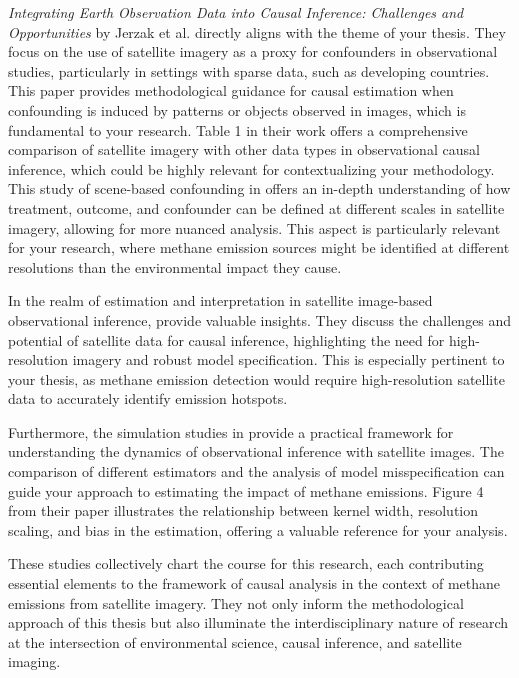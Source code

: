 \textit{Integrating Earth Observation Data into Causal Inference: Challenges and Opportunities} by Jerzak et al. \cite{jerzak_integrating_2023} directly aligns with the theme of your thesis. They focus on the use of satellite imagery as a proxy for confounders in observational studies, particularly in settings with sparse data, such as developing countries. This paper provides methodological guidance for causal estimation when confounding is induced by patterns or objects observed in images, which is fundamental to your research. Table 1 in their work \cite[Table 1]{jerzak_integrating_2023} offers a comprehensive comparison of satellite imagery with other data types in observational causal inference, which could be highly relevant for contextualizing your methodology. This study of scene-based confounding in \cite{jerzak_integrating_2023} offers an in-depth understanding of how treatment, outcome, and confounder can be defined at different scales in satellite imagery, allowing for more nuanced analysis. This aspect is particularly relevant for your research, where methane emission sources might be identified at different resolutions than the environmental impact they cause.

In the realm of estimation and interpretation in satellite image-based observational inference, provide valuable insights. They discuss the challenges and potential of satellite data for causal inference, highlighting the need for high-resolution imagery and robust model specification. This is especially pertinent to your thesis, as methane emission detection would require high-resolution satellite data to accurately identify emission hotspots.

Furthermore, the simulation studies in \cite{jerzak_integrating_2023} provide a practical framework for understanding the dynamics of observational inference with satellite images. The comparison of different estimators and the analysis of model misspecification can guide your approach to estimating the impact of methane emissions. Figure 4 from their paper \cite[Figure 4]{jerzak_integrating_2023} illustrates the relationship between kernel width, resolution scaling, and bias in the estimation, offering a valuable reference for your analysis.

These studies collectively chart the course for this research, each contributing essential elements to the framework of causal analysis in the context of methane emissions from satellite imagery. They not only inform the methodological approach of this thesis but also illuminate the interdisciplinary nature of research at the intersection of environmental science, causal inference, and satellite imaging.


